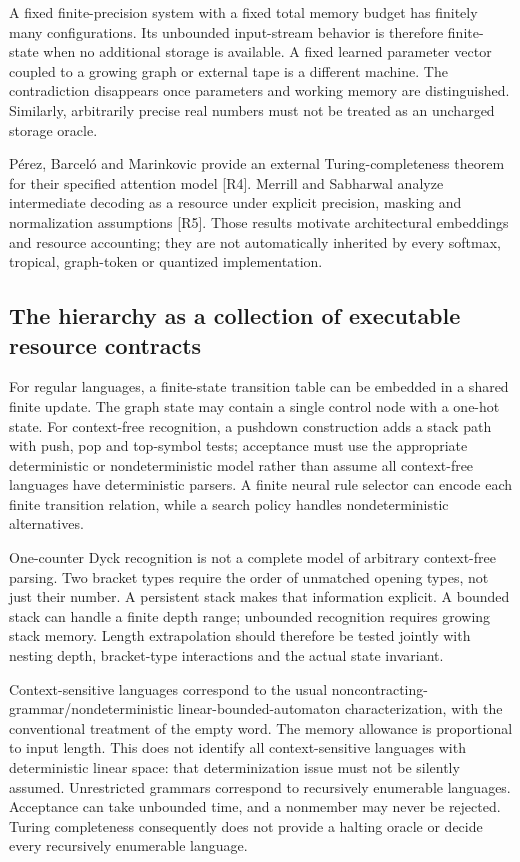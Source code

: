 A fixed finite-precision system with a fixed total memory budget has finitely many configurations. Its unbounded input-stream behavior is therefore finite-state when no additional storage is available. A fixed learned parameter vector coupled to a growing graph or external tape is a different machine. The contradiction disappears once parameters and working memory are distinguished. Similarly, arbitrarily precise real numbers must not be treated as an uncharged storage oracle.

P\'erez, Barcel\'o and Marinkovic provide an external Turing-completeness theorem for their specified attention model [R4]. Merrill and Sabharwal analyze intermediate decoding as a resource under explicit precision, masking and normalization assumptions [R5]. Those results motivate architectural embeddings and resource accounting; they are not automatically inherited by every softmax, tropical, graph-token or quantized implementation.

\subsection{The hierarchy as a collection of executable resource contracts}

For regular languages, a finite-state transition table can be embedded in a shared finite update. The graph state may contain a single control node with a one-hot state. For context-free recognition, a pushdown construction adds a stack path with push, pop and top-symbol tests; acceptance must use the appropriate deterministic or nondeterministic model rather than assume all context-free languages have deterministic parsers. A finite neural rule selector can encode each finite transition relation, while a search policy handles nondeterministic alternatives.

One-counter Dyck recognition is not a complete model of arbitrary context-free parsing. Two bracket types require the order of unmatched opening types, not just their number. A persistent stack makes that information explicit. A bounded stack can handle a finite depth range; unbounded recognition requires growing stack memory. Length extrapolation should therefore be tested jointly with nesting depth, bracket-type interactions and the actual state invariant.

Context-sensitive languages correspond to the usual noncontracting-grammar/nondeterministic linear-bounded-automaton characterization, with the conventional treatment of the empty word. The memory allowance is proportional to input length. This does not identify all context-sensitive languages with deterministic linear space: that determinization issue must not be silently assumed. Unrestricted grammars correspond to recursively enumerable languages. Acceptance can take unbounded time, and a nonmember may never be rejected. Turing completeness consequently does not provide a halting oracle or decide every recursively enumerable language.

